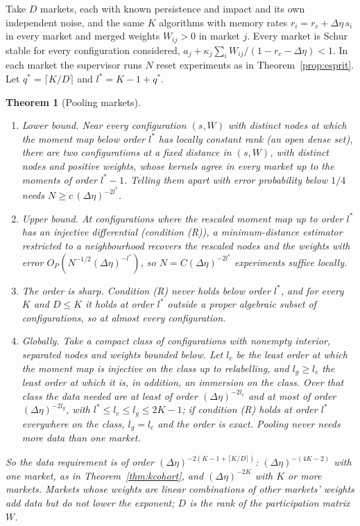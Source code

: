 \documentclass[12pt]{article}
\newtheorem{theorem}{Theorem}[section]
\theoremstyle{definition}
\theoremstyle{remark}
\begin{document}
Take $D$ markets, each with known persistence and impact and its own independent noise, and the same $K$ algorithms with memory rates $r_i=r_c+\Delta\eta\,s_i$ in every market and merged weights $W_{ij}>0$ in market $j$. Every market is Schur stable for every configuration considered, $a_j+\kappa_j\sum_iW_{ij}/(1-r_c-\Delta\eta)<1$. In each market the supervisor runs $N$ reset experiments as in Theorem~\ref{prop:esprit}. Let $q^*=\lceil K/D\rceil$ and $l^*=K-1+q^*$.

\begin{theorem}[Pooling markets]\label{thm:pool}
\begin{enumerate}[label=(\roman*),itemsep=1pt]
\item \emph{Lower bound.} Near every configuration $(s,W)$ with distinct nodes at which the moment map below order $l^*$ has locally constant rank (an open dense set), there are two configurations at a fixed distance in $(s,W)$, with distinct nodes and positive weights, whose kernels agree in every market up to the moments of order $l^*-1$. Telling them apart with error probability below $1/4$ needs $N\ge c\,(\Delta\eta)^{-2l^*}$.
\item \emph{Upper bound.} At configurations where the rescaled moment map up to order $l^*$ has an injective differential (condition (R)), a minimum-distance estimator restricted to a neighbourhood recovers the rescaled nodes and the weights with error $O_P(N^{-1/2}(\Delta\eta)^{-l^*})$, so $N=C(\Delta\eta)^{-2l^*}$ experiments suffice locally.
\item \emph{The order is sharp.} Condition (R) never holds below order $l^*$, and for every $K$ and $D\le K$ it holds at order $l^*$ outside a proper algebraic subset of configurations, so at almost every configuration.
\item \emph{Globally.} Take a compact class of configurations with nonempty interior, separated nodes and weights bounded below. Let $l_c$ be the least order at which the moment map is injective on the class up to relabelling, and $l_g\ge l_c$ the least order at which it is, in addition, an immersion on the class. Over that class the data needed are at least of order $(\Delta\eta)^{-2l_c}$ and at most of order $(\Delta\eta)^{-2l_g}$, with $l^*\le l_c\le l_g\le2K-1$; if condition (R) holds at order $l^*$ everywhere on the class, $l_g=l_c$ and the order is exact. Pooling never needs more data than one market.
\end{enumerate}
So the data requirement is of order $(\Delta\eta)^{-2(K-1+\lceil K/D\rceil)}$: $(\Delta\eta)^{-(4K-2)}$ with one market, as in Theorem~\ref{thm:kcohort}, and $(\Delta\eta)^{-2K}$ with $K$ or more markets. Markets whose weights are linear combinations of other markets' weights add data but do not lower the exponent; $D$ is the rank of the participation matrix $W$.
\end{theorem}
\end{document}
